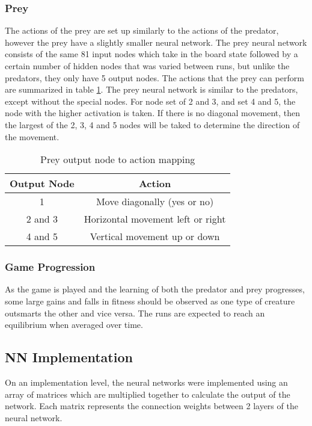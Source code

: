 \subsubsection{Prey}
		The actions of the prey are set up similarly to the actions of the predator, however the prey have a slightly smaller neural network. The prey neural network consists of the same 81 input nodes which take in the board state followed by a certain number of hidden nodes that was varied between runs, but unlike the predators, they only have 5 output nodes. The actions that the prey can perform are summarized in table \ref{tab:prey-actions}. The prey neural network is similar to the predators, except without the special nodes. For node set of 2 and 3, and set 4 and 5, the node with the higher activation is taken. If there is no diagonal movement, then the largest of the 2, 3, 4 and 5 nodes will be taked to determine the direction of the movement.

\begin{table}
  \centering
  \begin{tabular}{|c|c|}
    \hline
    Output Node & Action \\
    \hline
    1 & Move diagonally (yes or no)\\
    2 and 3 & Horizontal movement left or right \\
    4 and 5 & Vertical movement up or down \\
    \hline
  \end{tabular}
  \caption{Prey output node to action mapping}
  \label{tab:prey-actions}
\end{table}


	
\subsubsection{Game Progression}
		As the game is played and the learning of both the predator and prey progresses, some large gains and falls in fitness should be observed as one type of creature outsmarts the other and vice versa. The runs are expected to reach an equilibrium when averaged over time. 

\subsection{NN Implementation}
	On an implementation level, the neural networks were implemented using an array of matrices which are multiplied together to calculate the output of the network. Each matrix represents the connection weights between 2 layers of the  neural network. 


